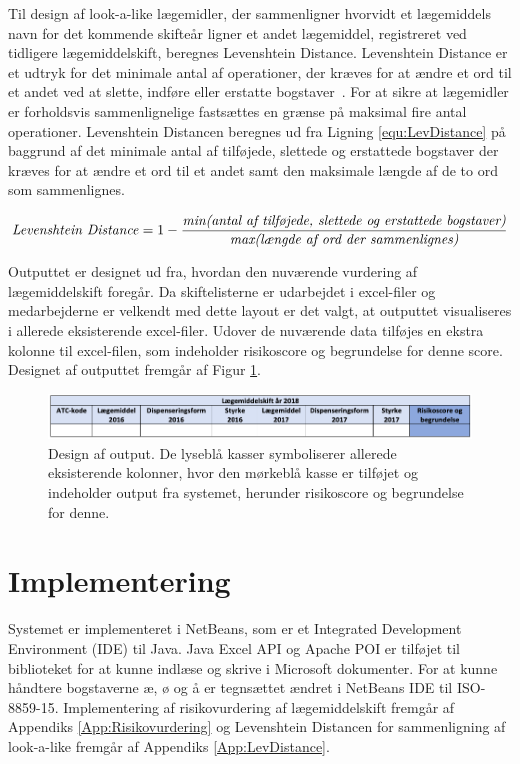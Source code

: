 Til design af look-a-like lægemidler, der sammenligner hvorvidt et lægemiddels navn for det kommende skifteår ligner et andet lægemiddel, registreret ved tidligere lægemiddelskift, beregnes Levenshtein Distance. Levenshtein Distance er et udtryk for det minimale antal af operationer, der kræves for at ændre et ord til et andet ved at slette, indføre eller erstatte bogstaver~\citep{Schepens2012}. For at sikre at lægemidler er forholdsvis sammenlignelige fastsættes en grænse på maksimal fire antal operationer. Levenshtein Distancen beregnes ud fra Ligning \ref{equ:LevDistance} på baggrund af det minimale antal af tilføjede, slettede og erstattede bogstaver der kræves for at ændre et ord til et andet samt den maksimale længde af de to ord som sammenlignes. 

\begin{equation} \label{equ:LevDistance}
\mbox{\textit{Levenshtein Distance}} = 1 - \frac{\mbox{\textit{min(antal af tilføjede, slettede og erstattede bogstaver)}}}{\mbox{\textit{max(længde af ord der sammenlignes)}}}   
\end{equation}

Outputtet er designet ud fra, hvordan den nuværende vurdering af lægemiddelskift foregår. Da skiftelisterne er udarbejdet i excel-filer og medarbejderne er velkendt med dette layout er det valgt, at outputtet visualiseres i allerede eksisterende excel-filer. Udover de nuværende data tilføjes en ekstra kolonne til excel-filen, som indeholder risikoscore og begrundelse for denne score. Designet af outputtet fremgår af Figur \ref{fig:Output}.

\vspace{0.2cm}
\begin{figure}[H]\centering
\includegraphics[width=1\textwidth]{billeder/Output.png} 
	\caption{Design af output. De lyseblå kasser symboliserer allerede eksisterende kolonner, hvor den mørkeblå kasse er tilføjet og indeholder output fra systemet, herunder risikoscore og begrundelse for denne.}
	\label{fig:Output}  
\end{figure}

\newpage
\section{Implementering}
Systemet er implementeret i NetBeans, som er et Integrated Development Environment (IDE) til Java.  Java Excel API og Apache POI er tilføjet til biblioteket for at kunne indlæse og skrive i Microsoft dokumenter. For at kunne håndtere bogstaverne æ, ø og å er tegnsættet ændret i NetBeans IDE til ISO-8859-15. Implementering af risikovurdering af lægemiddelskift fremgår af Appendiks \ref{App:Risikovurdering} og Levenshtein Distancen for sammenligning af look-a-like fremgår af Appendiks \ref{App:LevDistance}.

